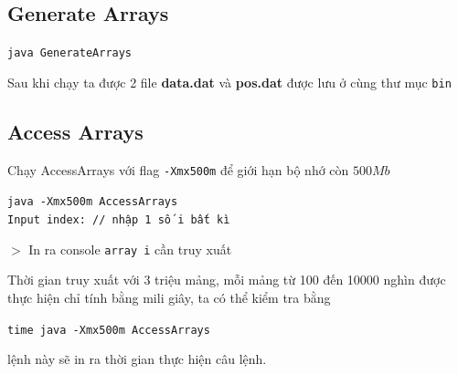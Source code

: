 \documentclass[a4paper]{article}
\theoremstyle{definition}
\begin{document}
\subsection{Generate Arrays}
\begin{mdframed}[backgroundcolor=backcolour, linecolor=backcolour]
  \texttt{java GenerateArrays}
\end{mdframed}
Sau khi chạy ta được 2 file \textbf{data.dat} và \textbf{pos.dat} được lưu ở cùng thư mục \texttt{bin}
\subsection{Access Arrays}
\item Chạy AccessArrays với flag \texttt{-Xmx500m} để giới hạn bộ nhớ còn $500Mb$
\begin{mdframed}[backgroundcolor=backcolour, linecolor=backcolour]
  \texttt{java -Xmx500m AccessArrays\\
    Input index: // nhập 1 số i bất kì}
\end{mdframed}
$>$ In ra console \texttt{array i} cần truy xuất
\item Thời gian truy xuất với 3 triệu mảng, mỗi mảng từ 100 đến 10000 nghìn được thực hiện chỉ tính bằng mili giây, ta có thể kiểm tra bằng
\begin{mdframed}[backgroundcolor=backcolour, linecolor=backcolour]
  \texttt{time java -Xmx500m AccessArrays}
\end{mdframed}
\item lệnh này sẽ in ra thời gian thực hiện câu lệnh.
\end{document}
